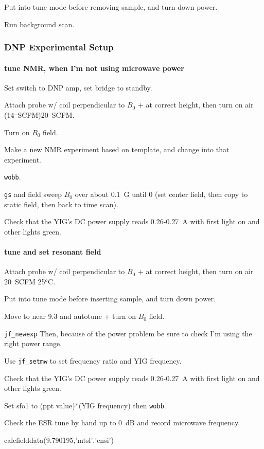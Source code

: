Put into tune mode before removing sample, and turn down power.

Run background scan.

\subsubsection{DNP Experimental Setup}
\paragraph{tune NMR, when I'm not using microwave power}
Set switch to DNP amp, set bridge to standby.

Attach probe w/ coil perpendicular to $B_0$ + at correct height, then turn on air \sout{(14~SCFM)}20~SCFM.

Turn on $B_0$ field.

Make a new NMR experiment based on template, and change into that experiment.

\texttt{wobb}. 

\texttt{gs} and field sweep $B_0$ over about 0.1~G until 0 (set center field, then copy to static field, then back to time scan).

Check that the YIG's DC power supply reads 0.26-0.27~A with first light on and other lights green.

\paragraph{tune and set resonant field}
Attach probe w/ coil perpendicular to $B_0$ + at correct height, then turn on air 20~SCFM 25$^o$C.

Put into tune mode before inserting sample, and turn down power.

Move to near \sout{9.3} and autotune + turn on $B_0$ field.

\texttt{jf\_newexp}
Then, because of the power problem be sure to check I'm using the right power range.

Use \texttt{jf\_setmw} to set frequency ratio and YIG frequency.

Check that the YIG's DC power supply reads 0.26-0.27~A with first light on and other lights green.

Set sfo1 to (ppt value)*(YIG frequency) then \texttt{wobb}.

Check the ESR tune by hand up to 0~dB and record microwave frequency.
\begin{python}[off]
calcfielddata(9.790195,'mtsl','cnsi')
\end{python}

